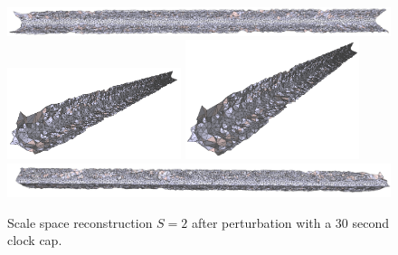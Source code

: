 \documentclass[12pt]{drexelthesis}
\begin{document}
\begin{figure}[!ht]
	
	\centering
		\includegraphics[width=5in]{simulated-lab-scan/0noise/optimizedNeat/scalespace2perturb00.png}
		\includegraphics[width=2in]{simulated-lab-scan/0noise/optimizedNeat/scalespace2perturb01.png}
		\includegraphics[width=2in]{simulated-lab-scan/0noise/optimizedNeat/scalespace2perturb02.png}
		\includegraphics[width=5in]{simulated-lab-scan/0noise/optimizedNeat/scalespace2perturb03.png}
		\caption[Scale space reconstruction $S = 2$ after perturbation with a 30 second clock cap]{\centering Scale space reconstruction $S = 2$ after perturbation with a 30 second clock cap.}
	\label{zeronoise:scalespace2perturb}
\end{figure}
\end{document}
